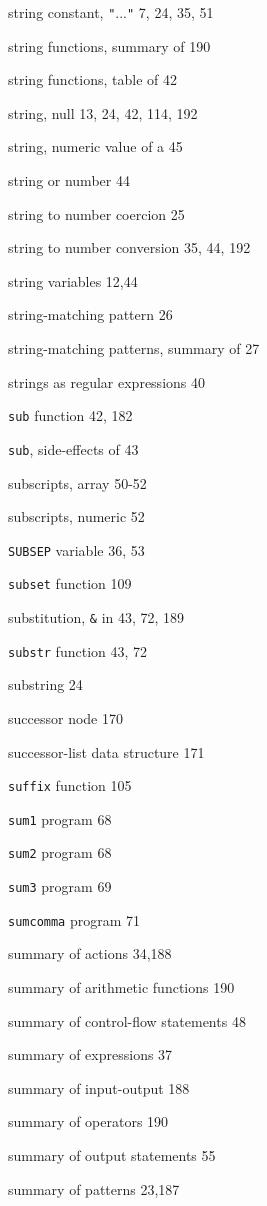 \begin{multicols}{3}
string constant, \verb'"'...\verb'"' 7, 24, 35, 51

string functions, summary of 190

string functions, table of 42

string, null 13, 24, 42, 114, 192

string, numeric value of a 45

string or number 44

string to number coercion 25

string to number conversion 35, 44, 192

string variables 12,44

string-matching pattern 26

string-matching patterns, summary of 27

strings as regular expressions 40

\verb'sub' function 42, 182

\verb'sub', side-effects of 43

subscripts, array 50-52

subscripts, numeric 52

\verb'SUBSEP' variable 36, 53

\verb'subset' function 109

substitution, \verb'&' in 43, 72, 189

\verb'substr' function 43, 72

substring 24

successor node 170

successor-list data structure 171

\verb'suffix' function 105







\verb'sum1' program 68

\verb'sum2' program 68

\verb'sum3' program 69

\verb'sumcomma' program 71

summary of actions 34,188

summary of arithmetic functions 190

summary of control-flow statements 48

summary of expressions 37

summary of input-output 188

summary of operators 190

summary of output statements 55

summary of patterns 23,187


\end{multicols}
